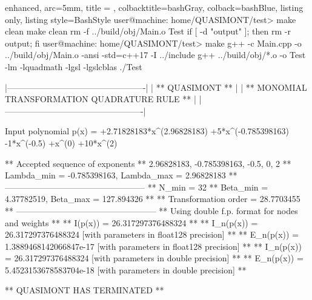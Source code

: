\documentclass[a4paper, twosided]{book}
\begin{document}
\vspace{0.2cm}
\begin{tcblisting}{enhanced,
                   arc=5mm,
                   title = \color{black}{\large \ttfamily Building and executing the test driver: p\_1(x)},
                   colbacktitle=bashGray,
                   colback=bashBlue,
                   listing only,
                   listing style=BashStyle}
user@machine: home/QUASIMONT/test> make clean
make clean
rm -f ../build/obj/Main.o Test
if [ -d "output" ]; then rm -r output; fi
user@machine: home/QUASIMONT/test> make
g++ -c Main.cpp -o ../build/obj/Main.o -ansi -std=c++17 -I ../include
g++ ../build/obj/*.o -o Test -lm -lquadmath -lgsl -lgslcblas
./Test

    |-------------------------------------------------|
    |                 ** QUASIMONT **                 |
    |  ** MONOMIAL TRANSFORMATION QUADRATURE RULE **  |
    |-------------------------------------------------|

 Input polynomial p(x) =  +2.71828183*x^(2.96828183) +5*x^(-0.785398163) -1*x^(-0.5) +x^(0)  +10*x^(2)

 ** Accepted sequence of exponents ** 
    {2.96828183, -0.785398163, -0.5, 0, 2}
 ** Lambda_min = -0.785398163, Lambda_max = 2.96828183 **
 --------------------------------------------------
 ** N_min = 32
 ** Beta_min = 4.37782519, Beta_max = 127.894326 **
 ** Transformation order = 28.7703455 **
 --------------------------------------------------
 ** Using double f.p. format for nodes and weights **
 ** I(p(x))   = 26.317297376488324 **
 ** I_n(p(x)) = 26.317297376488324      [with parameters in float128 precision] **
 ** E_n(p(x)) = 1.3889468142066847e-17  [with parameters in float128 precision] **
 ** I_n(p(x)) = 26.317297376488324      [with parameters in double precision] **
 ** E_n(p(x)) = 5.4523153678583704e-18  [with parameters in double precision] **

 ** QUASIMONT HAS TERMINATED **
\end{tcblisting}
\end{document}
